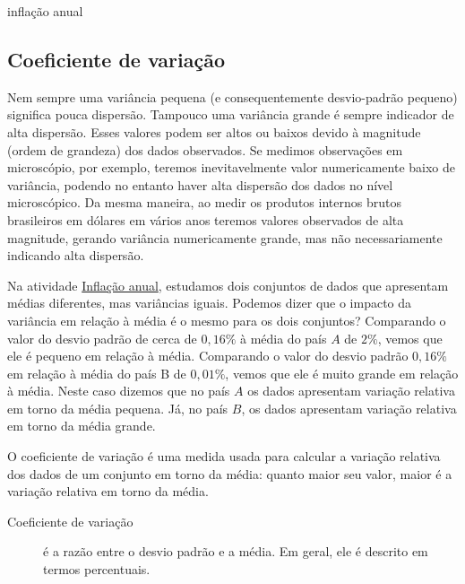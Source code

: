 {{\begin{task}{inflação anual}
\begin{enumerate}
\end{enumerate}
\end{task}


\subsection{Coeficiente de variação}

Nem sempre uma variância pequena (e consequentemente desvio-padrão pequeno) significa pouca dispersão. Tampouco uma variância grande é sempre indicador de alta dispersão. Esses valores podem ser altos ou baixos devido à magnitude (ordem de grandeza) dos dados observados. Se medimos observações em microscópio, por exemplo, teremos inevitavelmente valor numericamente baixo de variância, podendo no entanto haver alta dispersão dos dados no nível microscópico. Da mesma maneira, ao medir os produtos internos brutos brasileiros em dólares em vários anos teremos valores observados de alta magnitude, gerando variância numericamente grande, mas não necessariamente indicando alta dispersão.

Na atividade \hyperref[inflacao-dois-paises]{Inflação anual}, estudamos dois conjuntos de dados que apresentam médias diferentes, mas variâncias iguais. Podemos dizer que o impacto da variância em relação à média é o mesmo para os dois conjuntos? Comparando o valor do desvio padrão de cerca de $0{,}16\%$ à média do país $A$ de $2\%$, vemos que ele é pequeno em relação à média. Comparando o valor do desvio padrão $0{,}16\%$ em relação à média do país B de $0{,}01\%$, vemos que ele é muito grande em relação à média. Neste caso dizemos que no país $A$ os dados apresentam variação relativa em torno da média pequena. Já, no país $B$, os dados apresentam variação relativa em torno da média grande.



O coeficiente de variação é uma medida usada para calcular a variação relativa dos dados de um conjunto em torno da média: quanto maior seu valor, maior é a variação relativa em torno da média.
\begin{description}
\item[{Coeficiente de variação}] \leavevmode{}\label{\detokenize{PE104-4:term-coeficiente-de-variacao}}
é a razão entre o desvio padrão e a média. Em geral, ele é descrito em termos percentuais.

\end{description}

}}
